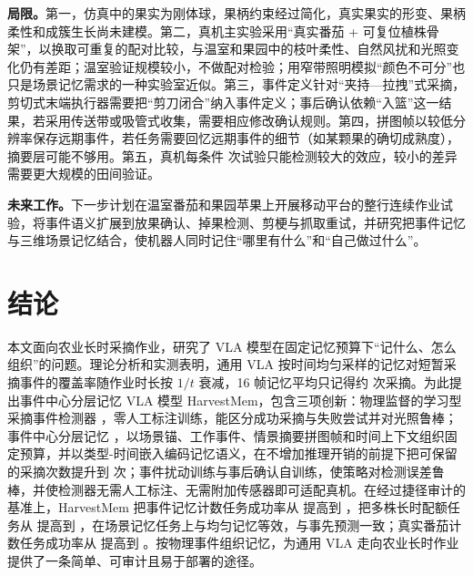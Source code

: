 \textbf{局限。}第一，仿真中的果实为刚体球，果柄约束经过简化，真实果实的形变、果柄柔性和成簇生长尚未建模。第二，真机主实验采用“真实番茄 + 可复位植株骨架”，以换取可重复的配对比较，与温室和果园中的枝叶柔性、自然风扰和光照变化仍有差距；温室验证规模较小，不做配对检验；用窄带照明模拟“颜色不可分”也只是场景记忆需求的一种实验室近似。第三，事件定义针对“夹持—拉拽”式采摘，剪切式末端执行器需要把“剪刀闭合”纳入事件定义；事后确认依赖“入篮”这一结果，若采用传送带或吸管式收集，需要相应修改确认规则。第四，拼图帧以较低分辨率保存远期事件，若任务需要回忆远期事件的细节（如某颗果的确切成熟度），摘要层可能不够用。第五，真机每条件  次试验只能检测较大的效应，较小的差异需要更大规模的田间验证。

\textbf{未来工作。}下一步计划在温室番茄和果园苹果上开展移动平台的整行连续作业试验，将事件语义扩展到放果确认、掉果检测、剪梗与抓取重试，并研究把事件记忆与三维场景记忆结合，使机器人同时记住“哪里有什么”和“自己做过什么”。

\section{结论}
\label{sec:conclusion}
本文面向农业长时采摘作业，研究了 VLA 模型在固定记忆预算下“记什么、怎么组织”的问题。理论分析和实测表明，通用 VLA 按时间均匀采样的记忆对短暂采摘事件的覆盖率随作业时长按 $1/t$ 衰减，16 帧记忆平均只记得约  次采摘。为此提出事件中心分层记忆 VLA 模型 HarvestMem，包含三项创新：物理监督的学习型采摘事件检测器 \pedet，零人工标注训练，能区分成功采摘与失败尝试并对光照鲁棒；事件中心分层记忆 \hem，以场景锚、工作事件、情景摘要拼图帧和时间上下文组织固定预算，并以类型-时间嵌入编码记忆语义，在不增加推理开销的前提下把可保留的采摘次数提升到  次；事件扰动训练与事后确认自训练，使策略对检测误差鲁棒，并使检测器无需人工标注、无需附加传感器即可适配真机。在经过捷径审计的 \bench{} 基准上，HarvestMem 把事件记忆计数任务成功率从  提高到 ，把多株长时配额任务从  提高到 ，在场景记忆任务上与均匀记忆等效，与事先预测一致；真实番茄计数任务成功率从  提高到 。按物理事件组织记忆，为通用 VLA 走向农业长时作业提供了一条简单、可审计且易于部署的途径。

